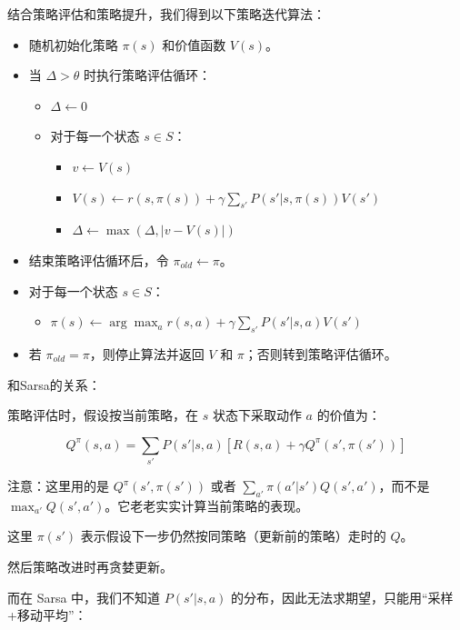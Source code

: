 结合策略评估和策略提升，我们得到以下策略迭代算法：

\begin{itemize}
\tightlist
\item
  随机初始化策略 \(\pi(s)\) 和价值函数 \(V(s)\)。
\item
  当 \(\Delta>\theta\) 时执行策略评估循环：

  \begin{itemize}
  \tightlist
  \item
    \(\Delta\leftarrow 0\)
  \item
    对于每一个状态 \(s\in S\)：

    \begin{itemize}
    \tightlist
    \item
      \(v\leftarrow V(s)\)
    \item
      \(V(s)\leftarrow r(s,\pi(s))+\gamma\sum_{s'}P(s'|s,\pi(s))V(s')\)
    \item
      \(\Delta\leftarrow \max(\Delta,|v-V(s)|)\)
    \end{itemize}
  \end{itemize}
\item
  结束策略评估循环后，令 \(\pi_{old}\leftarrow\pi\)。
\item
  对于每一个状态 \(s\in S\)：

  \begin{itemize}
  \tightlist
  \item
    \(\pi(s)\leftarrow \arg\max_a r(s,a)+\gamma\sum_{s'}P(s'|s,a)V(s')\)
  \end{itemize}
\item
  若 \(\pi_{old}=\pi\)，则停止算法并返回 \(V\) 和 \(\pi\)；否则转到策略评估循环。
\end{itemize}

和Sarsa的关系：

策略评估时，假设按当前策略，在 \(s\) 状态下采取动作 \(a\) 的价值为：

\[
Q^{\pi}(s,a)=\sum_{s'}P(s'|s,a)[R(s,a)+\gamma Q^{\pi}(s',\pi(s'))]
\]

注意：这里用的是 \(Q^{\pi}(s',\pi(s'))\) 或者 \(\sum_{a'}\pi(a'|s')Q(s',a')\)，而不是 \(\max_{a'}Q(s',a')\)。它老老实实计算当前策略的表现。

这里 \(\pi(s')\) 表示假设下一步仍然按同策略（更新前的策略）走时的 \(Q\)。

然后策略改进时再贪婪更新。

而在 Sarsa 中，我们不知道 \(P(s'|s,a)\) 的分布，因此无法求期望，只能用``采样+移动平均''：

